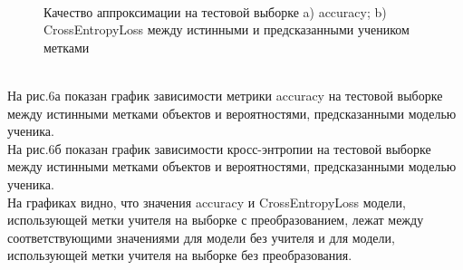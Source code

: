 \begin{figure}[h!t]\center
{}
\\
\caption{Качество аппроксимации на тестовой выборке a) accuracy; b) CrossEntropyLoss между истинными и предсказанными учеником метками}
\end{figure}\\
На рис.6а показан график зависимости метрики accuracy на тестовой выборке между истинными метками объектов и вероятностями, предсказанными моделью ученика.\\
На рис.6б показан график зависимости кросс-энтропии на тестовой выборке между истинными метками объектов и вероятностями, предсказанными моделью ученика.\\
На графиках видно, что значения accuracy и CrossEntropyLoss модели, использующей метки учителя на выборке с преобразованием, лежат между соответствующими значениями для модели без учителя и для модели, использующей метки учителя на выборке без преобразования.

